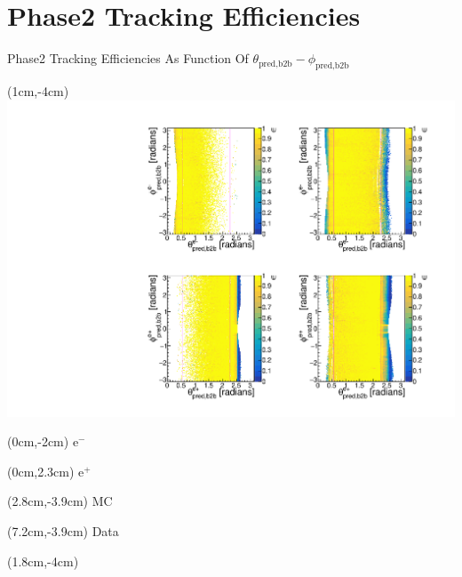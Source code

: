 \documentclass[8pt]{beamer}
\begin{document}
\section{Phase2 Tracking Efficiencies}


\begin{frame}{Phase2 Tracking Efficiencies As Function Of $\theta_{\textrm{pred,b2b}}-\phi_{\textrm{pred,b2b}}$}
	
	
	
	\begin{textblock*}{9cm}(1cm,-4cm)
		\includegraphics[width=\textwidth]{VPlots/P2/xCEffTP_MCData}
	\end{textblock*}
	
	\begin{textblock*}{2cm}(0cm,-2cm)
		$\textrm{e}^-$
	\end{textblock*}
	
		\begin{textblock*}{2cm}(0cm,2.3cm)
		$\textrm{e}^+$
	\end{textblock*}

	
\begin{textblock*}{2cm}(2.8cm,-3.9cm)
	MC
\end{textblock*}

\begin{textblock*}{2cm}(7.2cm,-3.9cm)
	Data
\end{textblock*}




\begin{textblock*}{9cm}(1.8cm,-4cm)
\end{textblock*}


\end{frame}
\end{document}
